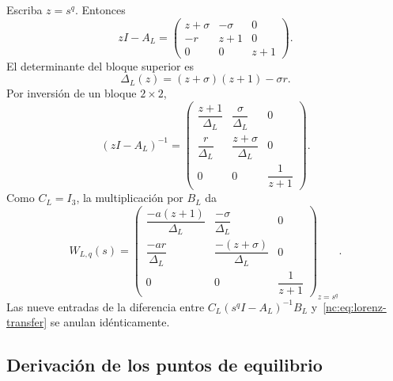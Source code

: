 Escriba \(z=s^q\). Entonces
\begin{equation}
 zI-A_L=
 \begin{pmatrix}
 z+\sigma&-\sigma&0\\
 -r&z+1&0\\
 0&0&z+1
 \end{pmatrix}.
\end{equation}
El determinante del bloque superior es
\begin{equation}
 \Delta_L(z)=(z+\sigma)(z+1)-\sigma r.
 \label{nc:eq:lorenz-delta}
\end{equation}
Por inversión de un bloque \(2\times2\),
\begin{equation}
 (zI-A_L)^{-1}=
 \begin{pmatrix}
 \dfrac{z+1}{\Delta_L}&\dfrac{\sigma}{\Delta_L}&0\\[7pt]
 \dfrac{r}{\Delta_L}&\dfrac{z+\sigma}{\Delta_L}&0\\[7pt]
 0&0&\dfrac{1}{z+1}
 \end{pmatrix}.
\end{equation}
Como \(C_L=I_3\), la multiplicación por \(B_L\) da
\begin{equation}
 W_{L,q}(s)=
 \begin{pmatrix}
 \dfrac{-a(z+1)}{\Delta_L}&
 \dfrac{-\sigma}{\Delta_L}&0\\[8pt]
 \dfrac{-ar}{\Delta_L}&
 \dfrac{-(z+\sigma)}{\Delta_L}&0\\[8pt]
 0&0&\dfrac{1}{z+1}
 \end{pmatrix}_{z=s^q}.
 \label{nc:eq:lorenz-transfer}
\end{equation}
Las nueve entradas de la diferencia entre
\(C_L(s^qI-A_L)^{-1}B_L\) y~\eqref{nc:eq:lorenz-transfer} se anulan
idénticamente.

\subsection{Derivación de los puntos de equilibrio}

